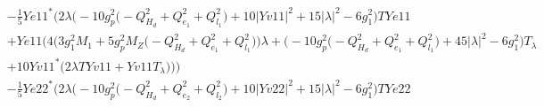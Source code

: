 \begin{align}
 &-\frac{1}{5} Ye11^* \Big(2 \lambda \Big(-10 g_{p}^{2} \Big(- Q_{H_d}^{2}  + Q_{e_{1}}^{2} + Q_{l_1}^{2}\Big) + 10 |Yv11|^2  + 15 |\lambda|^2  -6 g_{1}^{2} \Big)TYe11 \nonumber \\ 
 &+Ye11 \Big(4 \Big(3 g_{1}^{2} M_1  + 5 g_{p}^{2} M_Z \Big(- Q_{H_d}^{2}  + Q_{e_{1}}^{2} + Q_{l_1}^{2}\Big)\Big)\lambda +\Big(-10 g_{p}^{2} \Big(- Q_{H_d}^{2}  + Q_{e_{1}}^{2} + Q_{l_1}^{2}\Big) + 45 |\lambda|^2  -6 g_{1}^{2} \Big)T_{\lambda} \nonumber \\ 
 &+10 Yv11^* \Big(2 \lambda TYv11  + Yv11 T_{\lambda} \Big)\Big)\Big)\nonumber \\ 
 &-\frac{1}{5} Ye22^* \Big(2 \lambda \Big(-10 g_{p}^{2} \Big(- Q_{H_d}^{2}  + Q_{e_{2}}^{2} + Q_{l_2}^{2}\Big) + 10 |Yv22|^2  + 15 |\lambda|^2  -6 g_{1}^{2} \Big)TYe22 \nonumber 
\end{align} 
